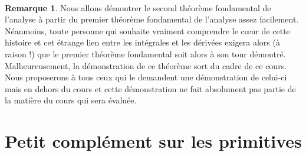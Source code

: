 \documentclass[a4paper,fontsize=13pt]{scrreprt}
\theoremstyle{plain}
\theoremstyle{definition}
\newtheorem{rema}[subsection]{Remarque}
\begin{document}
~\\
\begin{rema}
Nous allons démontrer le second théorème fondamental de l'analyse à partir du premier théorème fondamental de l'analyse assez facilement. Néanmoins, toute personne qui souhaite vraiment comprendre le c\oe ur de cette histoire et cet étrange lien entre les intégrales et les dérivées exigera alors (à raison !) que le premier théorème fondamental soit alors à son tour démontré. Malheureusement, la démonstration de ce théorème sort du cadre de ce cours. Nous proposerons à tous ceux qui le demandent une démonstration de celui-ci mais en dehors du cours et cette démonstration ne fait absolument pas partie de la matière du cours qui sera évaluée.
\end{rema}
\newpage
\section{Petit complément sur les primitives}
\end{document}

